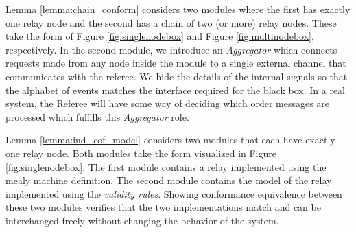 \documentclass[runningheads]{llncs}
\newcommand{\figref}[1]{Figure \ref{#1}}
\begin{document}
Lemma \ref{lemma:chain_conform} considers two modules where the first has exactly one relay node and the second has a chain of two (or more) relay nodes. These take the form of \figref{fig:singlenodebox} and \figref{fig:multinodebox}, respectively. In the second module, we introduce an \emph{Aggregator} which connects requests made from any node inside the module to a single external channel that communicates with the referee. We hide the details of the internal signals so that the alphabet of events matches the interface required for the black box. In a real system, the Referee will have some way of deciding which order messages are processed which fulfills this \emph{Aggregator} role. 

Lemma \ref{lemma:ind_cof_model} considers two modules that each have exactly one relay node. Both modules take the form visualized in \figref{fig:singlenodebox}. The first module contains a relay implemented using the mealy machine definition. The second module contains the model of the relay implemented using the \emph{validity rules}. Showing conformance equivalence between these two modules verifies that the two implementations match and can be interchanged freely without changing the behavior of the system. 
\end{document}
